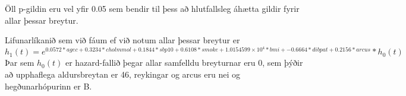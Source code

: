 \documentclass[
]{book}
\newenvironment{Shaded}{\begin{snugshade}}{\end{snugshade}}
\newcommand{\DecValTok}[1]{\textcolor[rgb]{0.00,0.00,0.81}{#1}}
\newcommand{\NormalTok}[1]{#1}
\newcommand{\OperatorTok}[1]{\textcolor[rgb]{0.81,0.36,0.00}{\textbf{#1}}}
\newcommand{\StringTok}[1]{\textcolor[rgb]{0.31,0.60,0.02}{#1}}
\begin{document}
\begin{Shaded}
\end{Shaded}

Öll p-gildin eru vel yfir 0.05 sem bendir til þess að hlutfallsleg áhætta gildir fyrir allar þessar breytur.

Lifunarlíkanið sem við fáum ef við notum allar þessar breytur er \(h_{1}(t)=e^{0.0572*agec+0.3234*cholmmol+0.1844*sbp10+0.6108*smoke+\ensuremath{1.0154599\times 10^{4}}*bmi+-0.6664*dibpat +0.2156*arcus}*h_{0}(t)\) Þar sem \(h_{0}(t)\) er hazard-fallið þegar allar samfelldu breyturnar eru 0, sem þýðir að upphaflega aldursbreytan er 46, reykingar og arcus eru nei og hegðunarhópurinn er B.

  
\end{document}
